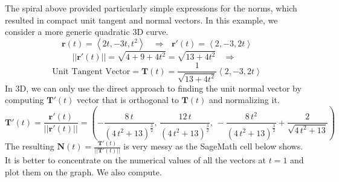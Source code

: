 The spiral above provided particularly simple expressions for the norms, which resulted in compact unit tangent and normal vectors.  In this example, we consider a more generic quadratic 3D curve.  
$$\mathbf{r}(t) = \left<  2t,-3t,t^2 \right> \ \ \ \ \Rightarrow \ \ \  \mathbf{r'}(t) = \left< 2,-3,2t \right> $$
$$ ||\mathbf{r'}(t)|| = \sqrt{4+9+4t^2}=\sqrt{13+4t^2}  \ \ \ \ \Rightarrow \ \ \  $$
$$\text{Unit Tangent Vector} =  \mathbf{T}(t) =  \frac{1}{\sqrt{13+4t^2}}\left< 2,-3,2t \right>
 $$
In 3D, we can only use the direct approach to finding the unit normal vector by computing $ \mathbf{T'}(t)$ vector that is orthogonal to $\mathbf{T}(t)$ and normalizing it.
$$ \mathbf{T'}(t) = \frac{ \mathbf{r'}(t)}{ ||\mathbf{r'}(t)|| } = \left(-\frac{8 \, t}{{\left(4 \, t^{2} + 13\right)}^{\frac{3}{2}}},\,\frac{12 \, t}{{\left(4 \, t^{2} + 13\right)}^{\frac{3}{2}}},\,-\frac{8 \, t^{2}}{{\left(4 \, t^{2} + 13\right)}^{\frac{3}{2}}} + \frac{2}{\sqrt{4 \, t^{2} + 13}}\right)$$
The resulting $ \mathbf{N}(t) = \frac{ \mathbf{T'}(t)}{ ||\mathbf{T'}(t)|| } $ is very messy as the SageMath cell below shows.  It is better to concentrate on the numerical values of all the vectors at $t=1$ and plot them on the graph.  We also compute.

